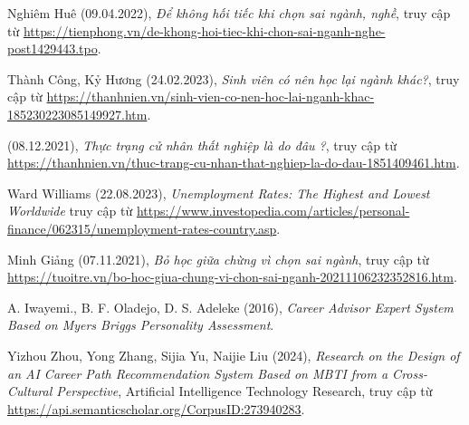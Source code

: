{}
\renewcommand\bibname{Tài liệu tham khảo}

\begin{thebibliography}{99}
    Nghiêm Huê (09.04.2022),
    \emph{Để không hối tiếc khi chọn sai ngành, nghề},
    truy cập từ \href{https://tienphong.vn/de-khong-hoi-tiec-khi-chon-sai-nganh-nghe-post1429443.tpo}{\color{black}https://tienphong.vn/de-khong-hoi-tiec-khi-chon-sai-nganh-nghe-post1429443.tpo}.

    Thành Công, Kỷ Hương (24.02.2023),
    \emph{Sinh viên có nên học lại ngành khác?},
    truy cập từ \href{https://thanhnien.vn/sinh-vien-co-nen-hoc-lai-nganh-khac-185230223085149927.htm}{\color{black}https://thanhnien.vn/sinh-vien-co-nen-hoc-lai-nganh-khac-185230223085149927.htm}.

    (08.12.2021),
    \emph{Thực trạng cử nhân thất nghiệp là do đâu ?},
    truy cập từ \href{https://thanhnien.vn/thuc-trang-cu-nhan-that-nghiep-la-do-dau-1851409461.htm}{\color{black}https://thanhnien.vn/thuc-trang-cu-nhan-that-nghiep-la-do-dau-1851409461.htm}.

    Ward Williams (22.08.2023),
    \emph{Unemployment Rates: The Highest and Lowest Worldwide}
    truy cập từ \href{https://www.investopedia.com/articles/personal-finance/062315/unemployment-rates-country.asp}{\color{black}https://www.investopedia.com/articles/personal-finance/062315/unemployment-rates-country.asp}.

    Minh Giảng (07.11.2021),
    \emph{Bỏ học giữa chừng vì chọn sai ngành},
    truy cập từ \href{https://tuoitre.vn/bo-hoc-giua-chung-vi-chon-sai-nganh-20211106232352816.htm}{\color{black}https://tuoitre.vn/bo-hoc-giua-chung-vi-chon-sai-nganh-20211106232352816.htm}.

    A. Iwayemi., B. F. Oladejo, D. S. Adeleke (2016),
    \emph{Career Advisor Expert System Based on Myers Briggs Personality Assessment}.

    Yizhou Zhou, Yong Zhang, Sijia Yu, Naijie Liu (2024),
    \emph{Research on the Design of an AI Career Path Recommendation System Based on MBTI from a Cross-Cultural Perspective},
    Artificial Intelligence Technology Research,
    truy cập từ \href{https://api.semanticscholar.org/CorpusID:273940283}{\color{black}https://api.semanticscholar.org/CorpusID:273940283}.


\end{thebibliography}
